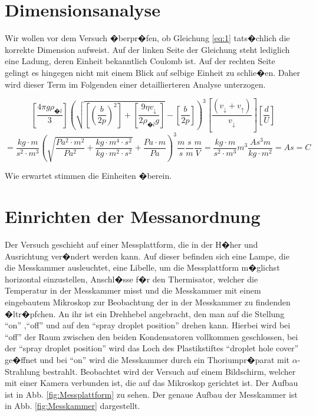 \documentclass{scrartcl}
\begin{document}
\section{Dimensionsanalyse}
Wir wollen vor dem Versuch �berpr�fen, ob Gleichung \eqref{eq:1}
tats�chlich die korrekte Dimension aufweist. Auf der linken Seite der
Gleichung steht lediglich eine Ladung, deren Einheit bekanntlich
Coulomb ist. Auf der rechten Seite gelingt es hingegen nicht mit einem
Blick auf selbige Einheit zu schlie�en. Daher wird dieser Term im
Folgenden einer detaillierteren Analyse unterzogen.

\[\left[\frac{4\pi g\rho_{\text{�}l}}{3}\right]\left(\sqrt{\left[\left(\frac{b}{2p}\right)^{2}\right]+\left[\frac{9\eta v_{\downarrow}}{2\rho_{\text{�}l}g}\right]}-\left[\frac{b}{2p}\right]\right)^{3}\left[\frac{\left(v_{\downarrow}+v_{\uparrow}\right)}{v_{\downarrow}}\right]\left[\frac{d}{U}\right]\]
\[=\frac{kg \cdot m}{s^2 \cdot m^3}
\left(\sqrt{\frac{Pa^2 \cdot m^2}{Pa^2}+\frac{kg \cdot m^4 \cdot
      s^2}{kg \cdot m^2 \cdot
      s^2}}+\frac{Pa \cdot m}{Pa}\right)^3 \frac{m}{s}\frac{s}{m}
\frac{m}{V}=\frac{kg \cdot m}{s^2 \cdot m^3}m^3\frac{As^3m}{kg \cdot m^2}=As=C\]

Wie erwartet stimmen die Einheiten �berein.

\section{Einrichten der Messanordnung}
Der Versuch geschieht auf einer Messplattform, die in der H�her und
Ausrichtung ver�ndert werden kann. Auf dieser befinden sich eine
Lampe, die die Messkammer ausleuchtet, eine Libelle, um die
Messplattform m�glichst horizontal einzustellen, Anschl�sse f�r den
Thermisator, welcher die Temperatur in der Messkammer misst und die
Messkammer mit einem eingebautem Mikroskop zur Beobachtung der in der
Messkammer zu findenden �ltr�pfchen. An ihr ist ein Drehhebel
angebracht, den man auf die Stellung "`on"' ,"`off"' und auf den
"`spray droplet position"' drehen kann. Hierbei wird bei "`off"' der
Raum zwischen den beiden Kondensatoren vollkommen geschlossen, bei der
"`spray droplet position"' wird das Loch des Plastikstiftes "`droplet
hole cover"' ge�ffnet und bei "`on"' wird die Messkammer durch ein
Thoriumpr�parat mit $\alpha$-Strahlung bestrahlt. Beobachtet wird der
Versuch auf einem Bildschirm, welcher mit einer Kamera verbunden ist,
die auf das Mikroskop gerichtet ist. Der Aufbau ist in Abb.
\ref{fig:Messplattform} zu sehen. Der genaue Aufbau der Messkammer ist
in Abb. \ref{fig:Messkammer} dargestellt. %
\end{document}
